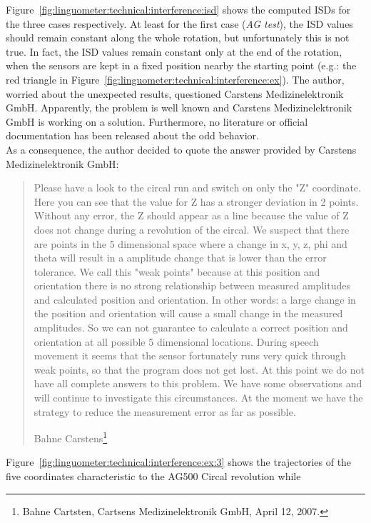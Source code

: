 Figure~\ref{fig:linguometer:technical:interference:isd} shows the computed
ISDs for the three cases respectively.
At least for the first case (\emph{AG test}), the ISD values should remain
constant along the whole rotation, but unfortunately this is not true.
In fact, the ISD values remain constant only at the end of the rotation, when
the sensors are kept in a fixed position nearby the starting point
(e.g.: the red triangle in 
Figure~\ref{fig:linguometer:technical:interference:ex}).
The author, worried about the unexpected results, questioned Carstens
Medizinelektronik GmbH. Apparently, the problem is well known and Carstens
Medizinelektronik GmbH is working on a solution. Furthermore, no literature or
official documentation has been released about the odd behavior.\\
As a consequence, the author decided to quote the answer provided by Carstens
Medizinelektronik GmbH:
\begin{quote}
Please have a look to the circal run and switch on only the "Z" coordinate.
Here you can see that the value for Z has a stronger deviation in 2 points.
Without any error, the Z should appear as a line because the value of Z does 
not change during a revolution of the circal.
We suspect that there are points in the 5 dimensional space where a change in x,
y, z, phi and theta will result in a amplitude change that is lower than the 
error tolerance.
We call this "weak points" because at this position and orientation there is no 
strong relationship between measured amplitudes and calculated position and 
orientation.
In other words: a large change in the position and orientation will cause a 
small change in the measured amplitudes.
So we can not guarantee to calculate a correct position and orientation at all 
possible 5 dimensional locations.
During speech movement it seems that the sensor fortunately runs very quick 
through weak points, so that the program does not get lost.
At this point we do not have all complete answers to this problem. 
We have some observations and will continue to investigate this circumstances.
At the moment we have the strategy to reduce the measurement error as far as 
possible.
\begin{flushright}
{\small Bahne Carstens\footnote{Bahne Cartsten, Cartsens Medizinelektronik GmbH,
April 12, 2007.}}
\end{flushright}
\end{quote}
Figure~\ref{fig:linguometer:technical:interference:ex:3} shows the trajectories 
of the five coordinates characteristic to the AG500 Circal revolution while
